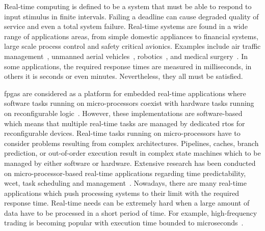 Real-time computing is defined to be a system that must be able to respond to input stimulus in finite intervals.
Failing a deadline can cause degraded quality of service and even a total system failure.
Real-time systems are found in a wide range of applications areas, from simple domestic appliances to financial systems, large scale process control and safety critical avionics.
Examples include air traffic management~\cite{crisostomi07,eele11}, unmanned aerial vehicles~\cite{ortiz06}, robotics~\cite{dellaert99}, and medical surgery~\cite{kwok10}.
In some applications, the required response times are measured in milliseconds, in others it is seconds or even minutes. 
Nevertheless, they all must be satisfied.

\glspl{fpga} are considered as a platform for embedded real-time applications where software tasks running on micro-processors coexist with hardware tasks running on reconfigurable logic~\cite{paul12,schoeberl08,whitham09,alteradoc}.
However, these implementations are software-based which means that multiple real-time tasks are managed by dedicated \gls{rtos} for reconfigurable devices.
Real-time tasks running on micro-processors have to consider problems resulting from complex architectures.
Pipelines, caches, branch prediction, or out-of-order execution result in complex state machines which to be managed by either software or hardware.
Extensive research has been conducted on micro-processor-based real-time applications regarding time predictability, \gls{wcet}, task scheduling and management~\cite{burns01,davis11,puschner00}.
Nowadays, there are many real-time applications which push processing systems to their limit with the required response time.
Real-time needs can be extremely hard when a large amount of data have to be processed in a short period of time.
For example, high-frequency trading is becoming popular with execution time bounded to microseconds~\cite{mcgowan10}. 

